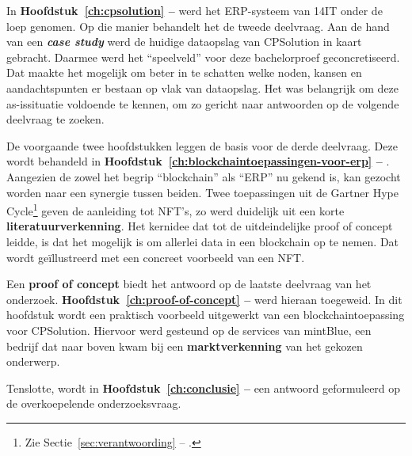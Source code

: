 In \textbf{Hoofdstuk~\ref{ch:cpsolution} -- } werd het ERP-systeem van 14IT onder de loep genomen. Op die manier behandelt het de tweede deelvraag. Aan de hand van een \textbf{\textit{case study}} werd de huidige dataopslag van CPSolution in kaart gebracht. Daarmee werd het ``speelveld'' voor deze bachelorproef geconcretiseerd. Dat maakte het mogelijk om beter in te schatten welke noden, kansen en aandachtspunten er bestaan op vlak van dataopslag. Het was belangrijk om deze as-issituatie voldoende te kennen, om zo gericht naar antwoorden op de volgende deelvraag te zoeken.

De voorgaande twee hoofdstukken leggen de basis voor de derde deelvraag. Deze wordt behandeld in \textbf{Hoofdstuk~\ref{ch:blockchaintoepassingen-voor-erp} -- }. Aangezien de zowel het begrip ``blockchain'' als ``ERP'' nu gekend is, kan gezocht worden naar een synergie tussen beiden. Twee toepassingen uit de Gartner Hype Cycle\footnote{Zie Sectie~\ref{sec:verantwoording} -- .} geven de aanleiding tot NFT's, zo werd duidelijk uit een korte \textbf{literatuurverkenning}. Het kernidee dat tot de uitdeindelijke proof of concept leidde, is dat het mogelijk is om allerlei data in een blockchain op te nemen. Dat wordt geïllustreerd met een concreet voorbeeld van een NFT.

Een \textbf{proof of concept} biedt het antwoord op de laatste deelvraag van het onderzoek. \textbf{Hoofdstuk~\ref{ch:proof-of-concept} -- } werd hieraan toegeweid. In dit hoofdstuk wordt een praktisch voorbeeld uitgewerkt van een blockchaintoepassing voor CPSolution. Hiervoor werd gesteund op de services van mintBlue, een bedrijf dat naar boven kwam bij een \textbf{marktverkenning} van het gekozen onderwerp.

Tenslotte, wordt in \textbf{Hoofdstuk~\ref{ch:conclusie} -- } een antwoord geformuleerd op de overkoepelende onderzoeksvraag. 

